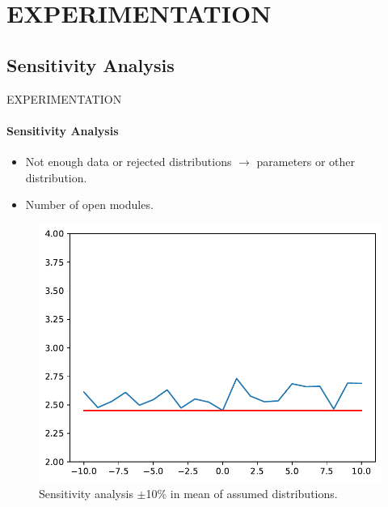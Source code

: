 \section{EXPERIMENTATION}
\subsection{Sensitivity Analysis}
\begin{frame}{EXPERIMENTATION}
    \framesubtitle{Sensitivity Analysis}
    \begin{itemize}
        \item Not enough data or rejected distributions $\rightarrow$ parameters or other distribution.
        \item Number of open modules.
    \end{itemize}
    \begin{figure}
        \centering
        \includegraphics[scale=.5]{images/sensitivity.pdf}
        \caption{Sensitivity analysis $\pm$10\% in mean of assumed distributions.}
    \end{figure}
\end{frame}

